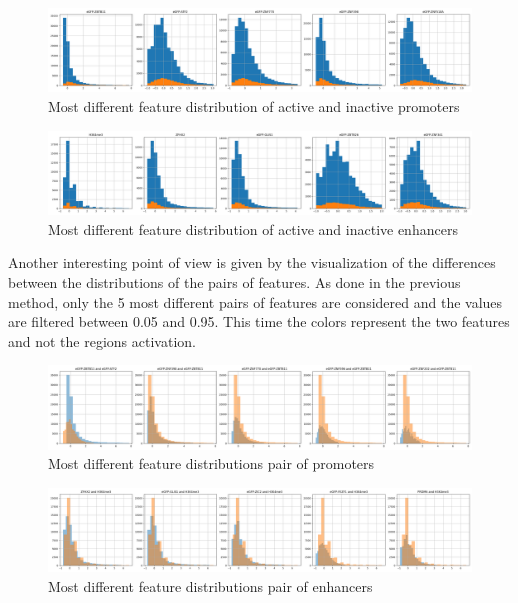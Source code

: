 \begin{figure}[h]
\centering
\includegraphics[width=0.95\linewidth]{../images/plot_feature_distribution_promoters.png}
\caption{Most different feature distribution of active and inactive promoters}
\end{figure}

\begin{figure}[h]
\centering
\includegraphics[width=0.95\linewidth]{../images/plot_feature_distribution_enhancers.png}
\caption{Most different feature distribution of active and inactive enhancers}
\end{figure}

Another interesting point of view is given by the visualization of the
differences between the distributions of the pairs of features. As done
in the previous method, only the 5 most different pairs of features are
considered and the values are filtered between 0.05 and 0.95. This time
the colors represent the two features and not the regions activation.

\begin{figure}[h]
\centering
\includegraphics[width=0.95\linewidth]{../images/plot_pair_feature_promoters.png}
\caption{Most different feature distributions pair of promoters}
\end{figure}

\begin{figure}[h]
\centering
\includegraphics[width=0.95\linewidth]{../images/plot_pair_feature_enhancers.png}
\caption{Most different feature distributions pair of enhancers}
\end{figure}

